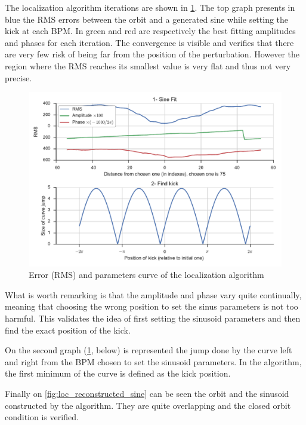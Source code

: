 The localization algorithm iterations are shown in \cref{fig:loc_errorplots}. The top graph presents in blue the RMS errors between the orbit and a generated sine while setting the kick at each BPM. In green and red are respectively the best fitting amplitudes and phases for each iteration. The convergence is visible and verifies that there are very few risk of being far from the position of the perturbation. However the region where the RMS reaches its smallest value is very flat and thus not very precise.

\begin{figure}
    \centering
    \includegraphics[width=\linewidth]{img/loc_errorplots}
    \caption{\label{fig:loc_errorplots} Error (RMS) and parameters curve of the localization algorithm}
\end{figure}

What is worth remarking is that the amplitude and phase vary quite continually, meaning that choosing the wrong position to set the sinus parameters is not too harmful. This validates the idea of first setting the sinusoid parameters and then find the exact position of the kick.

On the second graph (\cref{fig:loc_errorplots}, below) is represented the jump done by the curve left and right from the BPM chosen to set the sinusoid parameters. In the algorithm, the first minimum of the curve is defined as the kick position.

Finally on \cref{fig:loc_reconstructed_sine} can be seen the orbit and the sinusoid constructed by the algorithm. They are quite overlapping and the closed orbit condition is verified.

